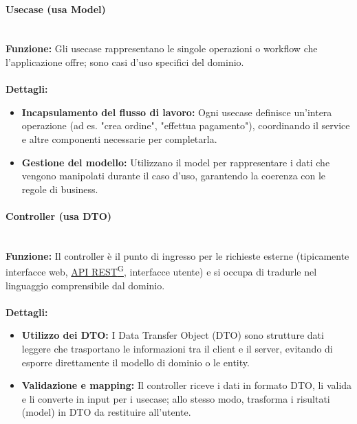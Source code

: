 \paragraph{Usecase (usa Model)}
\mbox{}\\
\textbf{Funzione:} Gli usecase rappresentano le singole operazioni o workflow che l’applicazione offre; sono casi d’uso specifici del dominio. \\
\mbox{}\\
\textbf{Dettagli:}
\begin{itemize}
  \item \textbf{Incapsulamento del flusso di lavoro:} Ogni usecase definisce un’intera operazione (ad es. "crea ordine", "effettua pagamento"), coordinando il service e altre componenti necessarie per completarla.
  \item \textbf{Gestione del modello:} Utilizzano il model per rappresentare i dati che vengono manipolati durante il caso d’uso, garantendo la coerenza con le regole di business.
\end{itemize}

\paragraph{Controller (usa DTO)}
\mbox{}\\
\textbf{Funzione:} Il controller è il punto di ingresso per le richieste esterne (tipicamente interfacce web, \href{https://code7crusaders.github.io/docs/PB/documentazione_interna/glossario.html#api-rest-representational-state-transfer}{API REST\textsuperscript{G}}, interfacce utente) e si occupa di tradurle nel linguaggio comprensibile dal dominio. \\
\mbox{}\\
\textbf{Dettagli:}
\begin{itemize}
  \item \textbf{Utilizzo dei DTO:} I Data Transfer Object (DTO) sono strutture dati leggere che trasportano le informazioni tra il client e il server, evitando di esporre direttamente il modello di dominio o le entity.
  \item \textbf{Validazione e mapping:} Il controller riceve i dati in formato DTO, li valida e li converte in input per i usecase; allo stesso modo, trasforma i risultati (model) in DTO da restituire all’utente.
\end{itemize}

